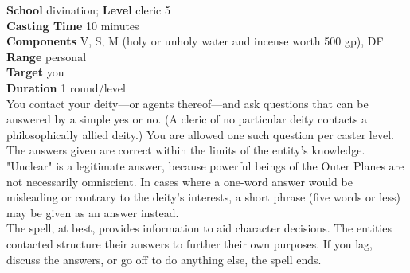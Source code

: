 \textbf{School} divination; \textbf{Level} cleric 5\\
\textbf{Casting Time} 10 minutes\\
\textbf{Components} V, S, M (holy or unholy water and incense worth 500 gp), DF\\
\textbf{Range} personal\\
\textbf{Target} you\\
\textbf{Duration} 1 round/level\\
You contact your deity—or agents thereof—and ask questions that can be answered by a simple yes or no. (A cleric of no particular deity contacts a philosophically allied deity.) You are allowed one such question per caster level. The answers given are correct within the limits of the entity's knowledge. "Unclear" is a legitimate answer, because powerful beings of the Outer Planes are not necessarily omniscient. In cases where a one-word answer would be misleading or contrary to the deity's interests, a short phrase (five words or less) may be given as an answer instead.\\
The spell, at best, provides information to aid character decisions. The entities contacted structure their answers to further their own purposes. If you lag, discuss the answers, or go off to do anything else, the spell ends.\\
